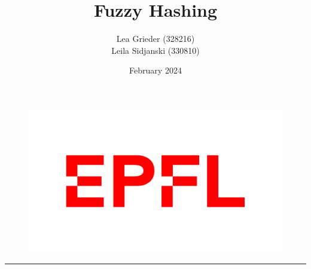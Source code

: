 \documentclass[12pt, a4paper, openany]{article}
\title{Fuzzy Hashing}
\author{Lea Grieder (328216)\\Leila Sidjanski (330810)}
\date{February 2024}
\begin{document}
\pagestyle{fancy}
\maketitle
\begin{figure}[h]
\includegraphics[scale=0.1]{latex-img/logo-epfl.png}
\centering
\end{figure}
\par\noindent\rule{\textwidth}{0.4pt}
\tableofcontents
\thispagestyle{fancy}

\newpage









\newpage

\appendix
\end{document}
